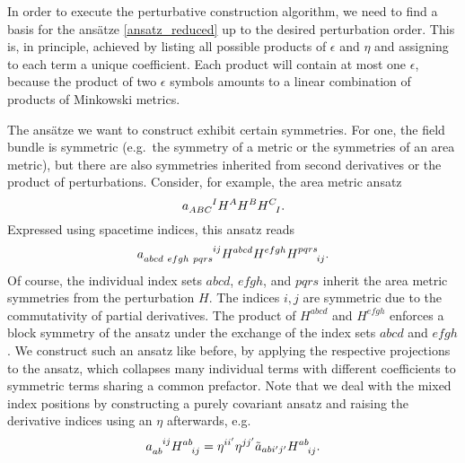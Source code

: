 In order to execute the perturbative construction algorithm, we need to find a basis for the ansätze \eqref{ansatz_reduced} up to the desired perturbation order. This is, in principle, achieved by listing all possible products of $\epsilon$ and $\eta$ and assigning to each term a unique coefficient. Each product will contain at most one $\epsilon$, because the product of two $\epsilon$ symbols amounts to a linear combination of products of Minkowski metrics.

The ansätze we want to construct exhibit certain symmetries. For one, the field bundle is symmetric (e.g.\ the symmetry of a metric or the symmetries of an area metric), but there are also symmetries inherited from second derivatives or the product of perturbations. Consider, for example, the area metric ansatz
\begin{equation}
  a_{ABC}^{\hphantom{ABC}I} H^A H^B H^C_{\hphantom CI}.
\end{equation}
Expressed using spacetime indices, this ansatz reads
\begin{equation}
  a_{abcd\ efgh\ pqrs}^{\hphantom{abcd\ efgh\ pqrs}ij} H^{abcd} H^{efgh} H^{pqrs}_{\hphantom{pqrs}ij}.
\end{equation}
Of course, the individual index sets $abcd$, $efgh$, and $pqrs$ inherit the area metric symmetries from the perturbation $H$. The indices $i,j$ are symmetric due to the commutativity of partial derivatives. The product of $H^{abcd}$ and $H^{efgh}$ enforces a block symmetry of the ansatz under the exchange of the index sets $abcd$ and $efgh$. We construct such an ansatz like before, by applying the respective projections to the ansatz, which collapses many individual terms with different coefficients to symmetric terms sharing a common prefactor. Note that we deal with the mixed index positions by constructing a purely covariant ansatz and raising the derivative indices using an $\eta$ afterwards, e.g.
\begin{equation}
  a_{ab}^{\hphantom{ab}ij} H^{ab}_{\hphantom{ab}ij} = \eta^{ii^\prime} \eta^{jj^\prime} \tilde a_{abi^\prime j^\prime} H^{ab}_{\hphantom{ab}ij}.
\end{equation}

